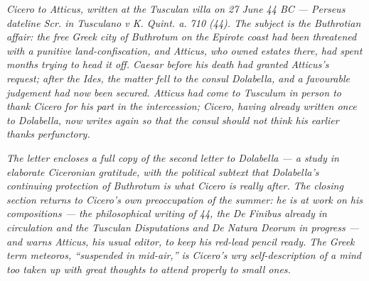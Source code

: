 
\textit{Cicero to Atticus, written at the Tusculan villa on 27
June 44 BC --- Perseus dateline \textit{Scr. in Tusculano v K.
Quint. a. 710 (44)}. The subject is the Buthrotian affair: the
free Greek city of Buthrotum on the Epirote coast had been
threatened with a punitive land-confiscation, and Atticus, who
owned estates there, had spent months trying to head it off.
Caesar before his death had granted Atticus's request; after
the Ides, the matter fell to the consul Dolabella, and a
favourable judgement had now been secured. Atticus had come to
Tusculum in person to thank Cicero for his part in the
intercession; Cicero, having already written once to Dolabella,
now writes again so that the consul should not think his
earlier thanks perfunctory.}

\textit{The letter encloses a full copy of the second letter to
Dolabella --- a study in elaborate Ciceronian gratitude, with
the political subtext that Dolabella's continuing protection of
Buthrotum is what Cicero is really after. The closing
section returns to Cicero's own preoccupation of the summer: he
is at work on his \textit{compositions} --- the philosophical
writing of 44, the De Finibus already in circulation and the
Tusculan Disputations and De Natura Deorum in progress --- and
warns Atticus, his usual editor, to keep his red-lead pencil
ready. The Greek term \textit{meteoros}, ``suspended in
mid-air,'' is Cicero's wry self-description of a mind too taken
up with great thoughts to attend properly to small ones.}
